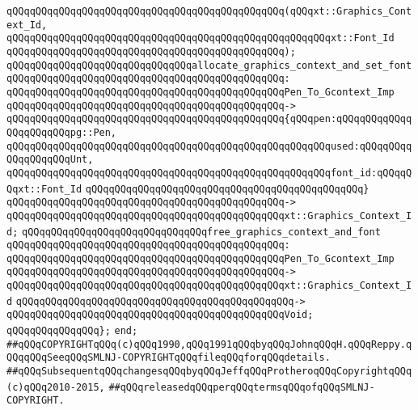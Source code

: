 \verb|qQQqqQQqqQQqqQQqqQQqqQQqqQQqqQQqqQQqqQQqqQQqqQQq(qQQqxt::Graphics_Context_Id,|\newline
\verb|qQQqqQQqqQQqqQQqqQQqqQQqqQQqqQQqqQQqqQQqqQQqqQQqqQQqqQQqxt::Font_Id|\newline
\verb|qQQqqQQqqQQqqQQqqQQqqQQqqQQqqQQqqQQqqQQqqQQqqQQq);|\newline
\newline
\verb|qQQqqQQqqQQqqQQqqQQqqQQqqQQqqQQqallocate_graphics_context_and_set_font|\newline
\verb|qQQqqQQqqQQqqQQqqQQqqQQqqQQqqQQqqQQqqQQqqQQqqQQq:|\newline
\verb|qQQqqQQqqQQqqQQqqQQqqQQqqQQqqQQqqQQqqQQqqQQqqQQqPen_To_Gcontext_Imp|\newline
\verb|qQQqqQQqqQQqqQQqqQQqqQQqqQQqqQQqqQQqqQQqqQQqqQQq->|\newline
\verb|qQQqqQQqqQQqqQQqqQQqqQQqqQQqqQQqqQQqqQQqqQQqqQQq{qQQqpen:qQQqqQQqqQQqqQQqqQQqqQQqpg::Pen,|\newline
\verb|qQQqqQQqqQQqqQQqqQQqqQQqqQQqqQQqqQQqqQQqqQQqqQQqqQQqqQQqused:qQQqqQQqqQQqqQQqqQQqUnt,|\newline
\verb|qQQqqQQqqQQqqQQqqQQqqQQqqQQqqQQqqQQqqQQqqQQqqQQqqQQqqQQqfont_id:qQQqqQQqxt::Font_Id|\newline
\verb|qQQqqQQqqQQqqQQqqQQqqQQqqQQqqQQqqQQqqQQqqQQqqQQq}|\newline
\verb|qQQqqQQqqQQqqQQqqQQqqQQqqQQqqQQqqQQqqQQqqQQqqQQq->|\newline
\verb|qQQqqQQqqQQqqQQqqQQqqQQqqQQqqQQqqQQqqQQqqQQqqQQqxt::Graphics_Context_Id;|\newline
\newline
\verb|qQQqqQQqqQQqqQQqqQQqqQQqqQQqqQQqfree_graphics_context_and_font|\newline
\verb|qQQqqQQqqQQqqQQqqQQqqQQqqQQqqQQqqQQqqQQqqQQqqQQq:|\newline
\verb|qQQqqQQqqQQqqQQqqQQqqQQqqQQqqQQqqQQqqQQqqQQqqQQqPen_To_Gcontext_Imp|\newline
\verb|qQQqqQQqqQQqqQQqqQQqqQQqqQQqqQQqqQQqqQQqqQQqqQQq->|\newline
\verb|qQQqqQQqqQQqqQQqqQQqqQQqqQQqqQQqqQQqqQQqqQQqqQQqxt::Graphics_Context_Id|\newline
\verb|qQQqqQQqqQQqqQQqqQQqqQQqqQQqqQQqqQQqqQQqqQQqqQQq->|\newline
\verb|qQQqqQQqqQQqqQQqqQQqqQQqqQQqqQQqqQQqqQQqqQQqqQQqVoid;|\newline
\newline
\verb|qQQqqQQqqQQqqQQq};|\newline
\newline
\verb|end;|\newline
\newline
\verb|##qQQqCOPYRIGHTqQQq(c)qQQq1990,qQQq1991qQQqbyqQQqJohnqQQqH.qQQqReppy.qQQqqQQqSeeqQQqSMLNJ-COPYRIGHTqQQqfileqQQqforqQQqdetails.|\newline
\verb|##qQQqSubsequentqQQqchangesqQQqbyqQQqJeffqQQqProtheroqQQqCopyrightqQQq(c)qQQq2010-2015,|\newline
\verb|##qQQqreleasedqQQqperqQQqtermsqQQqofqQQqSMLNJ-COPYRIGHT.|\newline

